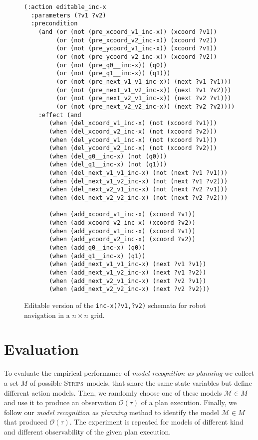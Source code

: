 \documentclass[letterpaper]{article} %
\newcommand{\strips}{\textsc{Strips}}     %
\begin{document}
\begin{figure}
  \begin{tiny}  
  \begin{verbatim}
(:action editable_inc-x
  :parameters (?v1 ?v2)
  :precondition
    (and (or (not (pre_xcoord_v1_inc-x)) (xcoord ?v1))
         (or (not (pre_xcoord_v2_inc-x)) (xcoord ?v2))
         (or (not (pre_ycoord_v1_inc-x)) (xcoord ?v1))                       
         (or (not (pre_ycoord_v2_inc-x)) (xcoord ?v2))
         (or (not (pre_q0__inc-x)) (q0))
         (or (not (pre_q1__inc-x)) (q1)))
         (or (not (pre_next_v1_v1_inc-x)) (next ?v1 ?v1)))
         (or (not (pre_next_v1_v2_inc-x)) (next ?v1 ?v2)))
         (or (not (pre_next_v2_v1_inc-x)) (next ?v2 ?v1)))
         (or (not (pre_next_v2_v2_inc-x)) (next ?v2 ?v2))))
    :effect (and
       (when (del_xcoord_v1_inc-x) (not (xcoord ?v1)))
       (when (del_xcoord_v2_inc-x) (not (xcoord ?v2)))
       (when (del_ycoord_v1_inc-x) (not (xcoord ?v1)))
       (when (del_ycoord_v2_inc-x) (not (xcoord ?v2)))
       (when (del_q0__inc-x) (not (q0)))
       (when (del_q1__inc-x) (not (q1)))
       (when (del_next_v1_v1_inc-x) (not (next ?v1 ?v1)))
       (when (del_next_v1_v2_inc-x) (not (next ?v1 ?v2)))
       (when (del_next_v2_v1_inc-x) (not (next ?v2 ?v1)))
       (when (del_next_v2_v2_inc-x) (not (next ?v2 ?v2)))
       
       (when (add_xcoord_v1_inc-x) (xcoord ?v1))
       (when (add_xcoord_v2_inc-x) (xcoord ?v2))
       (when (add_ycoord_v1_inc-x) (xcoord ?v1))
       (when (add_ycoord_v2_inc-x) (xcoord ?v2))
       (when (add_q0__inc-x) (q0))
       (when (add_q1__inc-x) (q1))
       (when (add_next_v1_v1_inc-x) (next ?v1 ?v1))
       (when (add_next_v1_v2_inc-x) (next ?v1 ?v2))
       (when (add_next_v2_v1_inc-x) (next ?v2 ?v1))
       (when (add_next_v2_v2_inc-x) (next ?v2 ?v2)))
  \end{verbatim}           
  \end{tiny}  
 \caption{\small Editable version of the {\tt\small inc-x(?v1,?v2)} schemata for robot navigation in a $n\times n$ grid.}
\label{fig:editable}
\end{figure}



\section{Evaluation}
\label{sec:evaluation}
To evaluate the empirical performance of {\em model recognition as planning} we collect a set $M$ of possible \strips\ models, that share the same state variables but define different action models. Then, we randomly choose one of these models $\mathcal{M}\in M$ and use it to produce an observation $\mathcal{O}(\tau)$ of a plan execution. Finally, we follow our {\em model recognition as planning} method to identify the model $\mathcal{M}\in M$ that produced $\mathcal{O}(\tau)$. The experiment is repeated for models of different kind and different observability of the given plan execution.
\end{document}
